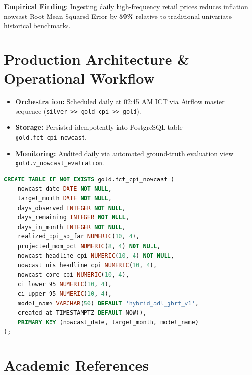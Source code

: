 \documentclass[11pt,a4paper]{article}
\begin{document}
\textbf{Empirical Finding:} Ingesting daily high-frequency retail prices reduces inflation nowcast Root Mean Squared Error by \textbf{59\%} relative to traditional univariate historical benchmarks.

\section{Production Architecture \& Operational Workflow}

\begin{itemize}
    \item \textbf{Orchestration:} Scheduled daily at 02:45 AM ICT via Airflow master sequence (\texttt{silver >> gold\_cpi >> gold}).
    \item \textbf{Storage:} Persisted idempotently into PostgreSQL table \texttt{gold.fct\_cpi\_nowcast}.
    \item \textbf{Monitoring:} Audited daily via automated ground-truth evaluation view \texttt{gold.v\_nowcast\_evaluation}.
\end{itemize}

\begin{lstlisting}[language=SQL, caption={Production PostgreSQL Schema for Nowcast Persistence}]
CREATE TABLE IF NOT EXISTS gold.fct_cpi_nowcast (
    nowcast_date DATE NOT NULL,
    target_month DATE NOT NULL,
    days_observed INTEGER NOT NULL,
    days_remaining INTEGER NOT NULL,
    days_in_month INTEGER NOT NULL,
    realized_cpi_so_far NUMERIC(10, 4),
    projected_mom_pct NUMERIC(8, 4) NOT NULL,
    nowcast_headline_cpi NUMERIC(10, 4) NOT NULL,
    nowcast_nis_headline_cpi NUMERIC(10, 4),
    nowcast_core_cpi NUMERIC(10, 4),
    ci_lower_95 NUMERIC(10, 4),
    ci_upper_95 NUMERIC(10, 4),
    model_name VARCHAR(50) DEFAULT 'hybrid_adl_gbrt_v1',
    created_at TIMESTAMPTZ DEFAULT NOW(),
    PRIMARY KEY (nowcast_date, target_month, model_name)
);
\end{lstlisting}

\section{Academic References}
\end{document}
